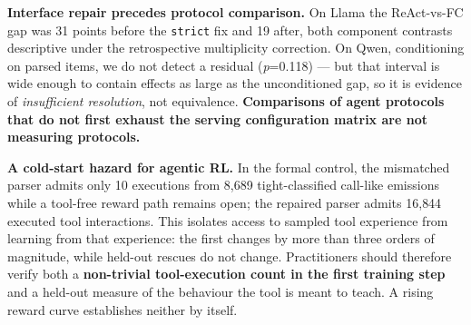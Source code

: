 \textbf{Interface repair precedes protocol comparison.} On Llama the ReAct-vs-FC gap was 31 points
before the \texttt{strict} fix and 19 after, both component contrasts descriptive under the retrospective multiplicity correction. On Qwen,
conditioning on parsed items, we do not detect a residual (\emph{p}=0.118) --- but that interval is
wide enough to contain effects as large as the unconditioned gap, so it is evidence of
\emph{insufficient resolution}, not equivalence. \textbf{Comparisons of agent protocols that do not
first exhaust the serving configuration matrix are not measuring protocols.}

\textbf{A cold-start hazard for agentic RL.} In the formal control, the mismatched parser admits
only 10 executions from 8{,}689 tight-classified call-like emissions while a tool-free reward path remains open;
the repaired parser admits 16{,}844 executed tool interactions. This isolates access to sampled tool
experience from learning from that experience: the first changes by more than three orders of magnitude,
while held-out rescues do not change. Practitioners should therefore verify both a
\textbf{non-trivial tool-execution count in the first training step} and a held-out measure of the
behaviour the tool is meant to teach. A rising reward curve establishes neither by itself.

